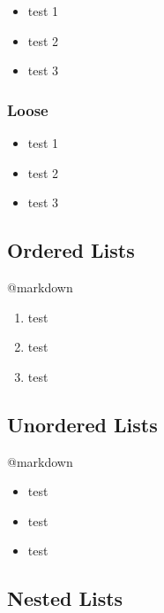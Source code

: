 \begin{itemize}
\item test 1

\item test 2

\item test 3

\end{itemize}

\subsubsection{Loose}
\label{loose}

\begin{itemize}
\item test 1

\item test 2

\item test 3

\end{itemize}

\subsection{Ordered Lists}
\label{orderedlists}

@markdown

\begin{enumerate}
\item test

\item test

\item test

\end{enumerate}

\subsection{Unordered Lists}
\label{unorderedlists}

@markdown

\begin{itemize}
\item test

\item test

\item test

\end{itemize}

\subsection{Nested Lists}
\label{nestedlists}

